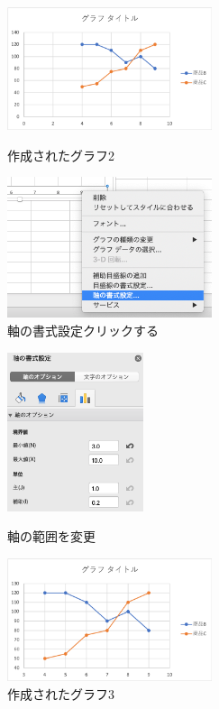 \begin{figure}[tb]
    \begin{minipage}{0.5\hsize}
        \centering
        \includegraphics[width=6cm]{chap2/line2.png}
        \caption{作成されたグラフ2}
        \label{fig:line2}
    \end{minipage}
    \begin{minipage}{0.5\hsize}
        \centering
        \includegraphics[width=6cm]{chap2/line_axis.png}
        \caption{軸の書式設定クリックする}
        \label{fig:line_axis}
    \end{minipage}
\end{figure}

\begin{figure}[tb]
    \begin{minipage}{0.5\hsize}
        \centering
        \includegraphics[width=4cm]{chap2/line_range.png}
        \caption{軸の範囲を変更}
        \label{fig:line_range}
    \end{minipage}
    \begin{minipage}{0.5\hsize}
        \centering
        \includegraphics[width=6cm]{chap2/line3.png}
        \caption{作成されたグラフ3}
        \label{fig:line3}
    \end{minipage}
\end{figure}

